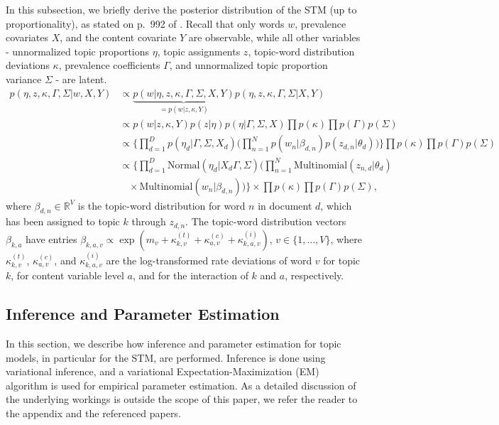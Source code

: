In this subsection, we briefly derive the posterior distribution of the STM (up to proportionality), as stated on p.\ 992 of \cite{roberts2016model}. Recall that only words $w$, prevalence covariates $X$, and the content covariate $Y$ are observable, while all other variables - unnormalized topic proportions $\eta$, topic assignments $z$, topic-word distribution deviations $\kappa$, prevalence coefficients $\Gamma$, and unnormalized topic proportion variance $\Sigma$ - are latent.
\begin{align*}
p(\eta, z, \kappa, \Gamma, \Sigma | w, X, Y) & \propto \underbrace{p(w | \eta, z, \kappa, \Gamma, \Sigma, X, Y)}_{=p(w | z, \kappa, Y)} p(\eta, z, \kappa, \Gamma, \Sigma | X, Y) \\
& \propto p(w | z, \kappa, Y) p(z | \eta) p(\eta | \Gamma, \Sigma, X) \prod p(\kappa) \prod p(\Gamma)p(\Sigma) \\
& \propto \Big\{ \prod_{d=1}^{D} p(\eta_d | \Gamma, \Sigma, X_d) \Big( \prod_{n=1}^{N} p(w_n | \beta_{d, n}) p(z_{d,n} | \theta_d) \Big) \Big\} \prod p(\kappa) \prod p(\Gamma) p(\Sigma) \\
& \propto \Big\{ \prod_{d=1}^{D} \text{Normal}(\eta_d | X_d \Gamma, \Sigma) \Big( \prod_{n=1}^{N} \text{Multinomial}(z_{n,d}| \theta_d) \\
& \ \ \ \ \times \text{Multinomial}(w_n | \beta_{d,n}) \Big) \Big\} \times \prod p(\kappa) \prod p(\Gamma) p(\Sigma),
\end{align*}
where $\beta_{d, n} \in \mathbb{R}^V$ is the topic-word distribution for word $n$ in document $d$, which has been assigned to topic $k$ through $z_{d,n}$. The topic-word distribution vectors $\beta_{k,a}$ have entries $\beta_{k,a,v} \propto \exp(m_{v} + \kappa_{k,v}^{(t)} + \kappa_{a,v}^{(c)} + \kappa_{k, a,v}^{(i)})$, $v \in \{1,\dots,V\}$, where $\kappa_{k,v}^{(t)}$, $\kappa_{a,v}^{(c)}$, and $\kappa_{k, a,v}^{(i)}$ are the log-transformed rate deviations of word $v$ for topic $k$, for content variable level $a$, and for the interaction of $k$ and $a$, respectively.

\subsection{Inference and Parameter Estimation}

In this section, we describe how inference and parameter estimation for topic models, in particular for the STM, are performed. Inference is done using variational inference, and a variational Expectation-Maximization (EM) algorithm is used for empirical parameter estimation. As a detailed discussion of the underlying workings is outside the scope of this paper, we refer the reader to the appendix and the referenced papers.

